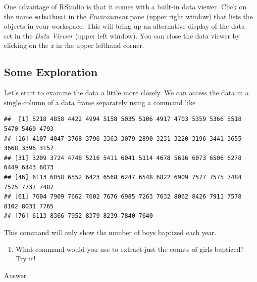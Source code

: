 \documentclass[
]{article}
\newenvironment{Shaded}{\begin{snugshade}}{\end{snugshade}}
\newcommand{\NormalTok}[1]{#1}
\newcommand{\OperatorTok}[1]{\textcolor[rgb]{0.81,0.36,0.00}{\textbf{#1}}}
\providecommand{\tightlist}{%
  \setlength{\itemsep}{0pt}\setlength{\parskip}{0pt}}
\begin{document}
One advantage of RStudio is that it comes with a built-in data viewer.
Click on the name \texttt{arbuthnot} in the \emph{Environment} pane
(upper right window) that lists the objects in your workspace. This will
bring up an alternative display of the data set in the \emph{Data
Viewer} (upper left window). You can close the data viewer by clicking
on the \emph{x} in the upper lefthand corner.

\hypertarget{some-exploration}{%
\subsection{Some Exploration}\label{some-exploration}}

Let's start to examine the data a little more closely. We can access the
data in a single column of a data frame separately using a command like

\begin{Shaded}
\end{Shaded}

\begin{verbatim}
##  [1] 5218 4858 4422 4994 5158 5035 5106 4917 4703 5359 5366 5518 5470 5460 4793
## [16] 4107 4047 3768 3796 3363 3079 2890 3231 3220 3196 3441 3655 3668 3396 3157
## [31] 3209 3724 4748 5216 5411 6041 5114 4678 5616 6073 6506 6278 6449 6443 6073
## [46] 6113 6058 6552 6423 6568 6247 6548 6822 6909 7577 7575 7484 7575 7737 7487
## [61] 7604 7909 7662 7602 7676 6985 7263 7632 8062 8426 7911 7578 8102 8031 7765
## [76] 6113 8366 7952 8379 8239 7840 7640
\end{verbatim}

This command will only show the number of boys baptized each year.

\begin{enumerate}
\def\labelenumi{\arabic{enumi}.}
\tightlist
\item
  What command would you use to extract just the counts of girls
  baptized? Try it!
\end{enumerate}

{Answer}

\begin{Shaded}
\end{Shaded}
\end{document}
